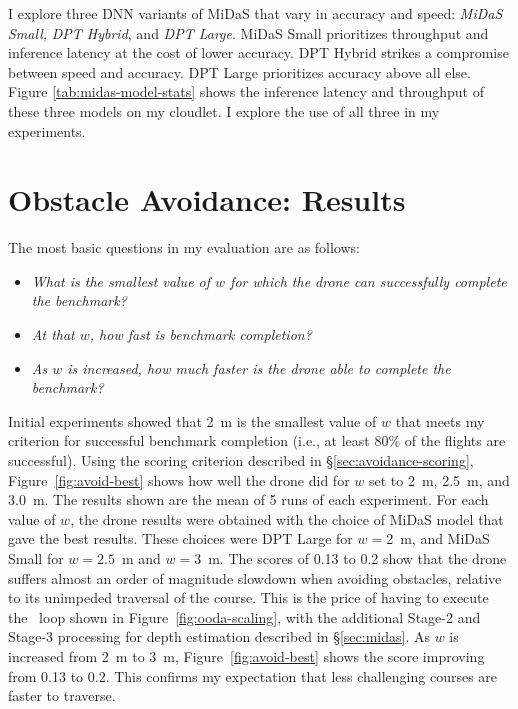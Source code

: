 I explore three DNN variants of MiDaS that vary in accuracy and speed:
{\em MiDaS Small,} {\em DPT Hybrid}, and {\em DPT Large}.  MiDaS Small
prioritizes throughput and inference latency at the cost of lower
accuracy. DPT Hybrid strikes a compromise between speed and accuracy.
DPT Large prioritizes accuracy above all else.  Figure
\ref{tab:midas-model-stats} shows the inference latency and throughput
of these three models on my cloudlet.  I explore the use of all three in my experiments.


\section{Obstacle Avoidance: Results}
\label{sec:avoidance-results}
The most basic questions in my evaluation are as follows:
\begin{itemize}
\item{\em What is the smallest value of $w$ for which the drone can
    successfully complete the benchmark?}

\item{\em At that $w$, how fast is benchmark completion?}

\item{\em As $w$ is increased, how much faster is the drone able to
    complete the benchmark?}
\end{itemize}

Initial experiments showed that 2~m is the smallest value of $w$
that meets my criterion for successful benchmark completion (i.e., at
least 80\% of the flights are successful).  Using the scoring
criterion described in \S\ref{sec:avoidance-scoring},
Figure~\ref{fig:avoid-best} shows how well the drone
 did for $w$ set
to 2~m, 2.5~m, and 3.0~m.  The results shown are the mean of 5 runs of
each experiment.  For each value of $w$, the drone results were
obtained with the choice of MiDaS model that gave the best results.
These choices were DPT Large for $w = $2~m, and MiDaS Small for $w =
2.5$~m and $w = 3$~m.  The scores of 0.13 to 0.2 show that the drone
suffers almost an order of magnitude slowdown when avoiding obstacles,
relative to its unimpeded traversal of the course.  This is the price
of having to execute the \ooda~loop shown in
Figure~\ref{fig:ooda-scaling}, with the additional Stage-2 and Stage-3
processing for depth estimation described in \S\ref{sec:midas}.  As
$w$ is increased from 2~m to 3~m, Figure~\ref{fig:avoid-best} shows
the score improving from 0.13 to 0.2.  This confirms my expectation
that less challenging courses are faster to traverse.

